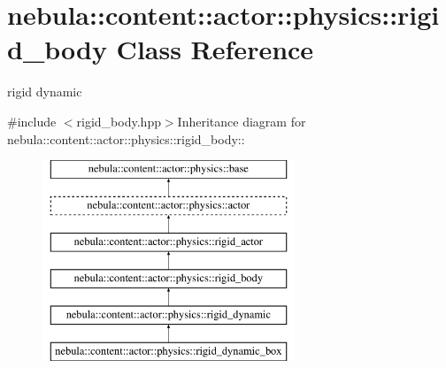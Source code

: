 \hypertarget{classnebula_1_1content_1_1actor_1_1physics_1_1rigid__body}{
\section{nebula::content::actor::physics::rigid\_\-body Class Reference}
\label{classnebula_1_1content_1_1actor_1_1physics_1_1rigid__body}
}


rigid dynamic  


{\ttfamily \#include $<$rigid\_\-body.hpp$>$}Inheritance diagram for nebula::content::actor::physics::rigid\_\-body::\begin{figure}[H]
\begin{center}
\leavevmode
\includegraphics[height=6cm]{classnebula_1_1content_1_1actor_1_1physics_1_1rigid__body}
\end{center}
\end{figure}

